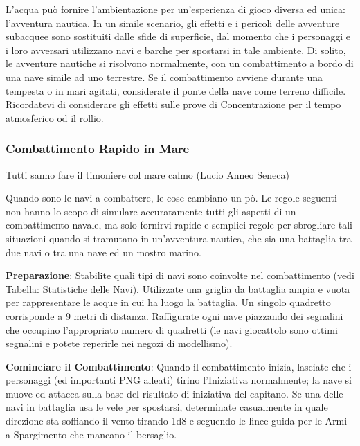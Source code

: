 \documentclass[a4paper,twoside,openany]{book}
\begin{document}
\begin{multicols}{2}

L'acqua può fornire l'ambientazione per un'esperienza di gioco diversa ed unica: l'avventura nautica. In un simile scenario, gli effetti e i pericoli delle avventure subacquee sono sostituiti dalle sfide di superficie, dal momento che i personaggi e i loro avversari utilizzano navi e barche per spostarsi in tale ambiente. Di solito, le avventure nautiche si risolvono normalmente, con un combattimento a bordo di una nave simile ad uno terrestre. Se il combattimento avviene durante una tempesta o in mari agitati, considerate il ponte della nave come terreno difficile. Ricordatevi di considerare gli effetti sulle prove di Concentrazione per il tempo atmosferico od il rollio.

\subsubsection{Combattimento Rapido in Mare}


\begin{changemargin}{0.3cm}{0.3cm}\begin{enfasi}{
Tutti sanno fare il timoniere col mare calmo (Lucio Anneo Seneca)
}
\end{enfasi}\end{changemargin}\medskip

Quando sono le navi a combattere, le cose cambiano un pò. Le regole seguenti non hanno lo scopo di simulare accuratamente tutti gli aspetti di un combattimento navale, ma solo fornirvi rapide e semplici regole per sbrogliare tali situazioni quando si tramutano in un'avventura nautica, che sia una battaglia tra due navi o tra una nave ed un mostro marino.

\textbf{Preparazione}: Stabilite quali tipi di navi sono coinvolte nel combattimento (vedi Tabella: Statistiche delle Navi). Utilizzate una griglia da battaglia ampia e vuota per rappresentare le acque in cui ha luogo la battaglia. Un singolo quadretto corrisponde a 9 metri di distanza. Raffigurate ogni nave piazzando dei segnalini che occupino l'appropriato numero di quadretti (le navi giocattolo sono ottimi segnalini e potete reperirle nei negozi di modellismo).

\textbf{Cominciare il Combattimento}: Quando il combattimento inizia, lasciate che i personaggi (ed importanti PNG alleati) tirino l'Iniziativa normalmente; la nave si muove ed attacca sulla base del risultato di iniziativa del capitano. Se una delle navi in battaglia usa le vele per spostarsi, determinate casualmente in quale direzione sta soffiando il vento tirando 1d8 e seguendo le linee guida per le Armi a Spargimento che mancano il bersaglio.


\end{multicols}
\end{document}
